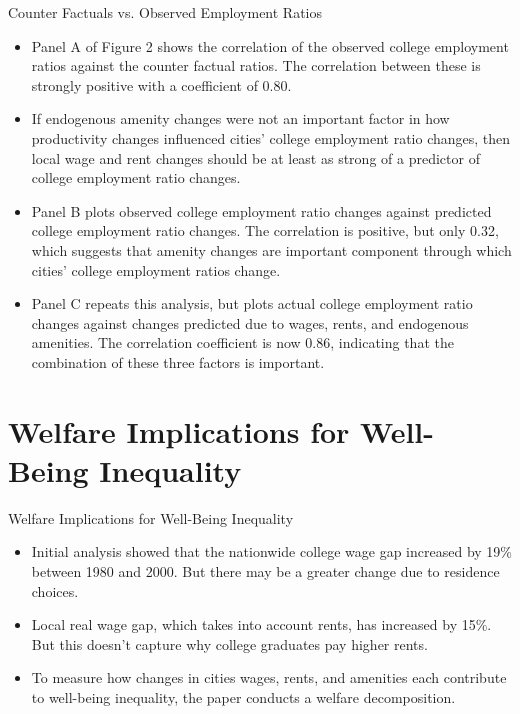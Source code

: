 \documentclass[aspectratio=169]{beamer}
\begin{document}

\begin{frame}{Counter Factuals vs. Observed Employment Ratios}

\begin{itemize}
    \item<1-> Panel A of Figure 2 shows the correlation of the observed college employment ratios against the counter factual ratios.  The correlation between these is strongly positive with a coefficient of 0.80.
    \item<2-> If endogenous amenity changes were not an important factor in how productivity changes influenced cities’ college employment ratio changes, then local wage and rent changes should be at least as strong of a predictor of college employment ratio changes.
    \item<3-> Panel B plots observed college employment ratio changes against predicted college employment ratio changes.  The correlation is positive, but only 0.32, which suggests that amenity changes are important component through which cities’ college employment ratios change.
    \item<4-> Panel C repeats this analysis, but plots actual college employment ratio changes against changes predicted due to wages, rents, and endogenous amenities.  The correlation coefficient is now 0.86, indicating that the combination of these three factors is important.
\end{itemize}
    
\end{frame}


\section{Welfare Implications for Well-Being Inequality}


\begin{frame}{Welfare Implications for Well-Being Inequality}

\begin{itemize}
    \item<1-> Initial analysis showed that the nationwide college wage gap increased by 19\% between 1980 and 2000.  But there may be a greater change due to residence choices.
    \item<2->  Local real wage gap, which takes into account rents, has increased by 15\%.  But this doesn’t capture why college graduates pay higher rents.
    \item<3-> To measure how changes in cities wages, rents, and amenities each contribute to well-being inequality, the paper conducts a welfare decomposition.
\end{itemize}
    
\end{frame}
\end{document}
